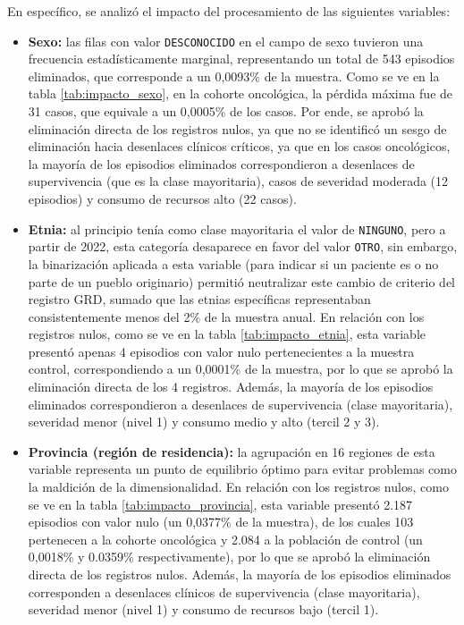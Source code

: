 En específico, se analizó el impacto del procesamiento de las siguientes variables:
\begin{itemize}
    \item \textbf{Sexo:} las filas con valor \texttt{DESCONOCIDO} en el campo de sexo tuvieron una frecuencia estadísticamente marginal, representando un total de 543 episodios eliminados, que corresponde a un 0,0093\% de la muestra. Como se ve en la tabla \ref{tab:impacto_sexo}, en la cohorte oncológica, la pérdida máxima fue de 31 casos, que equivale a un 0,0005\% de los casos. Por ende, se aprobó la eliminación directa de los registros nulos, ya que no se identificó un sesgo de eliminación hacia desenlaces clínicos críticos, ya que en los casos oncológicos, la mayoría de los episodios eliminados correspondieron a desenlaces de supervivencia (que es la clase mayoritaria), casos de severidad moderada (12 episodios) y consumo de recursos alto (22 casos).
    \item \textbf{Etnia:} al principio tenía como clase mayoritaria el valor de \texttt{NINGUNO}, pero a partir de 2022, esta categoría desaparece en favor del valor \texttt{OTRO}, sin embargo, la binarización aplicada a esta variable (para indicar si un paciente es o no parte de un pueblo originario) permitió neutralizar este cambio de criterio del registro GRD, sumado que las etnias específicas representaban consistentemente menos del 2\% de la muestra anual. En relación con los registros nulos, como se ve en la tabla \ref{tab:impacto_etnia}, esta variable presentó apenas 4 episodios con valor nulo pertenecientes a la muestra control, correspondiendo a un 0,0001\% de la muestra, por lo que se aprobó la eliminación directa de los 4 registros. Además, la mayoría de los episodios eliminados correspondieron a desenlaces de supervivencia (clase mayoritaria), severidad menor (nivel 1) y consumo medio y alto (tercil 2 y 3).
    \item \textbf{Provincia (región de residencia):} la agrupación en 16 regiones de esta variable representa un punto de equilibrio óptimo para evitar problemas como la maldición de la dimensionalidad. En relación con los registros nulos, como se ve en la tabla \ref{tab:impacto_provincia}, esta variable presentó 2.187 episodios con valor nulo (un 0,0377\% de la muestra), de los cuales 103 pertenecen a la cohorte oncológica y 2.084 a la población de control (un 0,0018\% y 0.0359\% respectivamente), por lo que se aprobó la eliminación directa de los registros nulos. Además, la mayoría de los episodios eliminados corresponden a desenlaces clínicos de supervivencia (clase mayoritaria), severidad menor (nivel 1) y consumo de recursos bajo (tercil 1).

\end{itemize}

